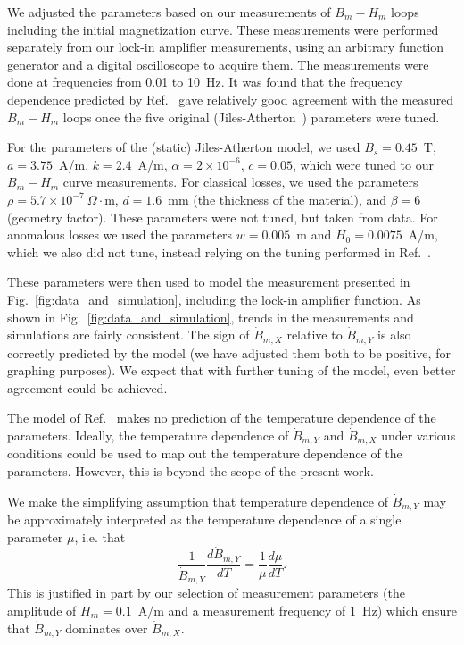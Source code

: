 We adjusted the parameters based on our
measurements of $B_m-H_m$ loops including the initial magnetization
curve.  These measurements were performed separately from our lock-in
amplifier measurements, using an arbitrary function generator and a
digital oscilloscope to acquire them.  The measurements were done at
frequencies from 0.01 to 10~Hz.  It was found that the frequency
dependence predicted by Ref.~\cite{jiles1994frequency} gave relatively good
agreement with the measured $B_m-H_m$ loops once the five original
(Jiles-Atherton~\cite{jiles1984theory,jiles1986theory}) parameters were tuned.

For the parameters of the (static) Jiles-Atherton model, we used
$B_s=0.45$~T, $a=3.75$~A/m, $k=2.4$~A/m, $\alpha=2\times 10^{-6}$,
$c=0.05$, which were tuned to our $B_m-H_m$ curve measurements.  For
classical losses, we used the parameters $\rho=5.7\times
10^{-7}~\Omega\cdot$m, $d=1.6$~mm (the thickness of the material), and
$\beta=6$ (geometry factor).  These parameters were not tuned, but
taken from data.  For anomalous losses we used the parameters
$w=0.005$~m and $H_0=0.0075$~A/m, which we also did not tune, instead
relying on the tuning performed in Ref.~\cite{jiles1994frequency}.

These parameters were then used to model the measurement presented in
Fig.~\ref{fig:data_and_simulation}, including the lock-in amplifier
function.  As shown in Fig.~\ref{fig:data_and_simulation}, trends in
the measurements and simulations are fairly consistent.  The sign of
$\dot{B}_{m,X}$ relative to $\dot{B}_{m,Y}$ is also correctly
predicted by the model (we have adjusted them both to be positive, for
graphing purposes).  We expect that with further tuning of the model,
even better agreement could be achieved.





The model of Ref.~\cite{jiles1994frequency} makes no prediction of the
temperature dependence of the parameters.  Ideally, the temperature
dependence of $\dot{B}_{m,Y}$ and $\dot{B}_{m,X}$ under various
conditions could be used to map out the temperature dependence of the
parameters.  However, this is beyond the scope of the present work.

We make the simplifying assumption that temperature dependence of
$\dot{B}_{m,Y}$ may be approximately interpreted as the temperature
dependence of a single parameter $\mu$, i.e. that
\begin{equation}
\frac{1}{\dot{B}_{m,Y}}\frac{d\dot{B}_{m,Y}}{dT}=\frac{1}{\mu}\frac{d\mu}{dT}.
\end{equation}
This is justified in part by our selection of measurement parameters
(the amplitude of $H_m=0.1$~A/m and a measurement frequency of 1~Hz)
which ensure that $\dot{B}_{m,Y}$ dominates over $\dot{B}_{m,X}$.

